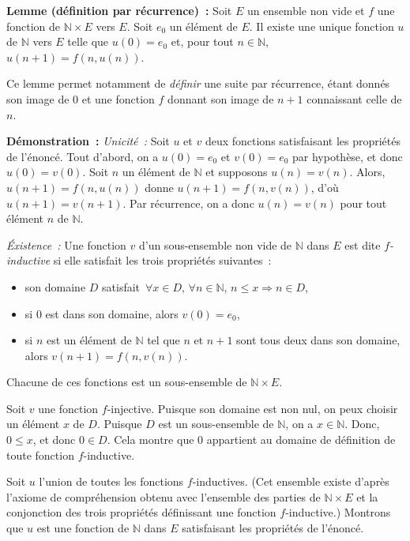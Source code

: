\medskip

\noindent\textbf{Lemme (définition par récurrence) :} Soit $E$ un ensemble non vide et $f$ une fonction de $\mathbb{N} \times E$ vers $E$.
    Soit $e_0$ un élément de $E$. 
    Il existe une unique fonction $u$ de $\mathbb{N}$ vers $E$ telle que $u(0) = e_0$ et, pour tout $n \in \mathbb{N}$, $u(n+1) = f(n, u(n))$.

\medskip

\noindent Ce lemme permet notamment de \textit{définir} une suite par récurrence, étant donnés son image de $0$ et une fonction $f$ donnant son image de $n+1$ connaissant celle de $n$.

\medskip

\noindent\textbf{Démonstration :}
\textit{Unicité :} Soit $u$ et $v$ deux fonctions satisfaisant les propriétés de l'énoncé. 
       Tout d'abord, on a $u(0) = e_0$ et $v(0) = e_0$ par hypothèse, et donc $u(0) = v(0)$.
       Soit $n$ un élément de $\mathbb{N}$ et supposons $u(n) = v(n)$. Alors, $u(n+1) = f(n, u(n))$ donne $u(n+1) = f(n, v(n))$, d'où $u(n+1) = v(n+1)$. 
       Par récurrence, on a donc $u(n) = v(n)$ pour tout élément $n$ de $\mathbb{N}$.

\textit{Éxistence :} Une fonction $v$ d'un sous-ensemble non vide de $\mathbb{N}$ dans $E$ est dite \textit{$f$-inductive} si elle satisfait les trois propriétés suivantes : 
    \begin{itemize}[nosep]
        \item son domaine $D$ satisfait $\forall x \in D, \, \forall n \in \mathbb{N}, \, n \leq x \Rightarrow n \in D$, 
        \item si $0$ est dans son domaine, alors $v(0) = e_0$, 
        \item si $n$ est un élément de $\mathbb{N}$ tel que $n$ et $n+1$ sont tous deux dans son domaine, alors $v(n+1) = f(n, v(n))$. 
    \end{itemize}
   Chacune de ces fonctions est un sous-ensemble de $\mathbb{N} \times E$. 
   
   Soit $v$ une fonction $f$-injective. 
   Puisque son domaine est non nul, on peux choisir un élément $x$ de $D$. 
   Puisque $D$ est un sous-ensemble de $\mathbb{N}$, on a $x \in \mathbb{N}$. 
   Donc, $0  \leq x$, et donc $0 \in D$.
   Cela montre que $0$ appartient au domaine de définition de toute fonction $f$-inductive. 

   Soit $u$ l'union de toutes les fonctions $f$-inductives. 
   (Cet ensemble existe d'après l'axiome de compréhension obtenu avec l'ensemble des parties de $\mathbb{N} \times E$ et la conjonction des trois propriétés définissant une fonction $f$-inductive.)
   Montrons que $u$ est une fonction de $\mathbb{N}$ dans $E$ satisfaisant les propriétés de l'énoncé. 

